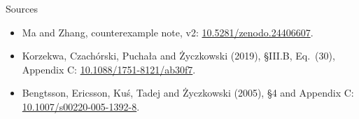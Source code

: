 \documentclass{beamer}
\begin{document}
\begin{frame}{Sources}
  \begin{itemize}
    \item Ma and Zhang, counterexample note, v2: \href{https://doi.org/10.5281/zenodo.24406607}{10.5281/zenodo.24406607}.
    \item Korzekwa, Czach\'orski, Pucha\l{}a and \.Zyczkowski (2019), \S III.B, Eq.~(30), Appendix C: \href{https://doi.org/10.1088/1751-8121/ab30f7}{10.1088/1751-8121/ab30f7}.
    \item Bengtsson, Ericsson, Ku\'s, Tadej and \.Zyczkowski (2005), \S4 and Appendix C: \href{https://doi.org/10.1007/s00220-005-1392-8}{10.1007/s00220-005-1392-8}.
  \end{itemize}
\end{frame}
\appendix
\FormalVerification
\end{document}

